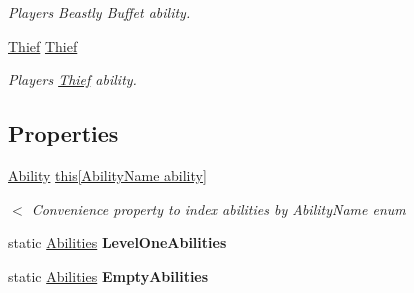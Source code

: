 \begin{DoxyCompactItemize}
\begin{DoxyCompactList}\small\item\em Player\textquotesingle{}s Beastly Buffet ability. \end{DoxyCompactList}\item 
\hyperlink{class_thief}{Thief} \hyperlink{class_abilities_ac71ab3ee9a0d9fc8daf678c8763ac2a8}{Thief}\hypertarget{class_abilities_ac71ab3ee9a0d9fc8daf678c8763ac2a8}{}\label{class_abilities_ac71ab3ee9a0d9fc8daf678c8763ac2a8}

\begin{DoxyCompactList}\small\item\em Player\textquotesingle{}s \hyperlink{class_thief}{Thief} ability. \end{DoxyCompactList}\end{DoxyCompactItemize}
\subsection*{Properties}
\begin{DoxyCompactItemize}
\item 
\hyperlink{class_ability}{Ability} \hyperlink{class_abilities_ad2b90b365897b841aeb301092813d09b}{this\mbox{[}\+Ability\+Name ability\mbox{]}}\hypertarget{class_abilities_ad2b90b365897b841aeb301092813d09b}{}\label{class_abilities_ad2b90b365897b841aeb301092813d09b}

\begin{DoxyCompactList}\small\item\em $<$ Convenience property to index abilities by Ability\+Name enum \end{DoxyCompactList}\item 
static \hyperlink{class_abilities}{Abilities} {\bfseries Level\+One\+Abilities}\hypertarget{class_abilities_a33bc828e5b43e25dcd78ee7c473ab024}{}\label{class_abilities_a33bc828e5b43e25dcd78ee7c473ab024}

\item 
static \hyperlink{class_abilities}{Abilities} {\bfseries Empty\+Abilities}\hypertarget{class_abilities_a42446f09bb231ba0439e7e3de4d3ae02}{}\label{class_abilities_a42446f09bb231ba0439e7e3de4d3ae02}

\end{DoxyCompactItemize}



